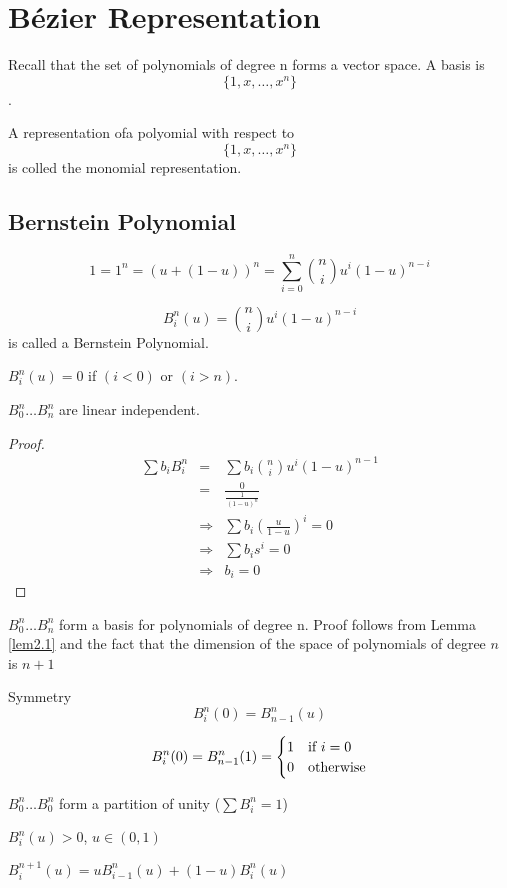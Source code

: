 \chapter{Bézier Representation}
Recall that the set of polynomials of degree n forms a vector space. A
basis is \[\{1, x, \dots, x^n\}\].
\begin{defi} A representation ofa polyomial with respect
  to \[\{1, x, \dots, x^n\}\] is colled the monomial representation.
\end{defi}
\section{Bernstein Polynomial}

\[1 = 1^n
    = (u + (1-u))^n 
    = \sum^n_{i=0} {n \choose i} u^i (1-u)^{n-i}\]
\begin{defi}
\[B^n_i(u) = {n \choose i}u^i (1-u)^{n-i}\] is called a Bernstein
Polynomial.
\end{defi}
\(B_i^n (u) = 0\) if \((i < 0)\) or \((i > n)\).
\begin{lem}
\label{lem2.1}
\(B_0^n \dots B_n^n\) are linear independent.
\end{lem}
\begin{proof}
\begin{eqnarray*}
  \sum b_i B_i^n &=& \sum b_i {n \choose i} u^i (1-u)^{n-1} \\
                &=& \frac{0}{\frac{1}{(1-u)^n}}\\
                &\Rightarrow& \sum b_i (\frac{u}{1-u})^i = 0\\
                &\Rightarrow& \sum b_i s^i = 0\\
                &\Rightarrow& b_i = 0
\end{eqnarray*}
\end{proof}
\begin{theo}
\(B_0^n \dots B_n^n \) form a basis for polynomials of degree n. Proof
follows from Lemma \ref{lem2.1} and the fact that the dimension of the
space of polynomials of degree \(n\) is \(n+1\)
\end{theo}
\begin{lem}{Symmetry}
\[B_i^n(0) = B^n_{n-1}(u)\]
\end{lem}
\begin{lem}
\begin{equation*}
  B_i^n(0) = B^n_{n-1}(1) = 
  \begin{cases}
    1 & \textrm{if } i=0 \cr
    0 & \textrm{otherwise} \cr
  \end{cases} 
\end{equation*}
\end{lem}
\begin{lem}
\(B_0^n \dots B_0^n \) form a partition of unity (\(\sum B_i^n = 1\))
\end{lem}
\begin{lem}
\(B_i^n(u)>0\), \(u\in(0,1)\)
\end{lem}
\begin{lem}
  \(B_i^{n+1}(u) = u B_{i-1}^n(u) + (1-u) B_i^n(u) \)
\end{lem}
